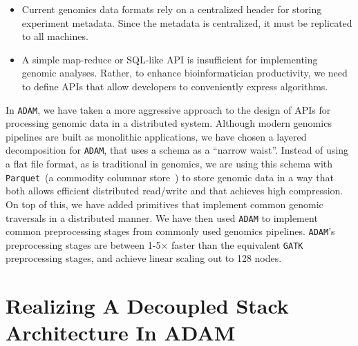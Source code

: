 \documentclass[phd]{ucbthesis}
\begin{document}
\begin{itemize}
\item Current genomics data formats rely on a centralized header for storing experiment metadata. Since the
metadata is centralized, it must be replicated to all machines.
\item A simple map-reduce or SQL-like API is insufficient for implementing genomic analyses. Rather, to enhance
bioinformatician productivity, we need to define APIs that allow developers to conveniently express algorithms.
\end{itemize}

In \texttt{ADAM}, we have taken a more aggressive approach to the design of APIs for processing genomic data
in a distributed system. Although modern genomics pipelines are built as monolithic applications, we have
chosen a layered decomposition for \texttt{ADAM}, that uses a schema as a ``narrow waist''. Instead of using
a flat file format, as is traditional in genomics, we are using this schema with \texttt{Parquet}~(a commodity columnar
store~\cite{parquet}) to store genomic data in a way that both allows efficient distributed read/write and that
achieves high compression. On top of this, we have added primitives that implement common genomic traversals
in a distributed manner. We have then used \texttt{ADAM} to implement common preprocessing stages from
commonly used genomics pipelines. \texttt{ADAM}'s preprocessing stages are between 1-5$\times$ faster than the
equivalent \texttt{GATK} preprocessing stages, and achieve linear scaling out to 128 nodes.

\section{Realizing A Decoupled Stack Architecture In \textsc{ADAM}}
\label{sec:realizing-stack-architecture}
\end{document}
